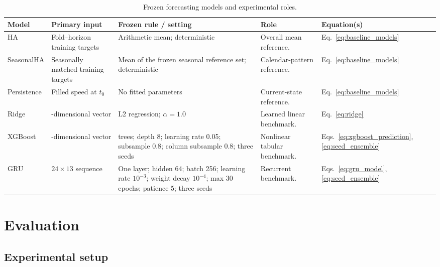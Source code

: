 \documentclass[pdflatex,sn-basic,Numbered]{sn-jnl}
\begin{document}
\begin{table}[!htbp]
\centering
\caption{Frozen forecasting models and experimental roles.}
\label{tab:model_protocol}
\footnotesize
\begin{tabularx}{\textwidth}{|>{\raggedright\arraybackslash}p{}|>{\raggedright\arraybackslash}p{}|>{\raggedright\arraybackslash}p{}|>{\raggedright\arraybackslash}X|>{\centering\arraybackslash}p{}|}
\hline
\textbf{Model} & \textbf{Primary input} & \textbf{Frozen rule / setting} & \textbf{Role} & \textbf{Equation(s)} \\
\hline
HA & Fold--horizon training targets & Arithmetic mean; deterministic & Overall mean reference. & Eq.~\eqref{eq:baseline_models} \\
\hline
SeasonalHA & Seasonally matched training targets & Mean of the frozen seasonal reference set; deterministic & Calendar-pattern reference. & Eq.~\eqref{eq:baseline_models} \\
\hline
Persistence & Filled speed at $t_0$ & No fitted parameters & Current-state reference. & Eq.~\eqref{eq:baseline_models} \\
\hline
Ridge & 315-dimensional vector & L2 regression; $\alpha=1.0$ & Learned linear benchmark. & Eq.~\eqref{eq:ridge} \\
\hline
XGBoost & 315-dimensional vector & 500 trees; depth 8; learning rate 0.05; subsample 0.8; column subsample 0.8; three seeds & Nonlinear tabular benchmark. & Eqs.~\eqref{eq:xgboost_prediction}, \eqref{eq:seed_ensemble} \\
\hline
GRU & $24\times13$ sequence & One layer; hidden 64; batch 256; learning rate $10^{-3}$; weight decay $10^{-4}$; max 30 epochs; patience 5; three seeds & Recurrent benchmark. & Eqs.~\eqref{eq:gru_model}, \eqref{eq:seed_ensemble} \\
\hline
\end{tabularx}
\end{table}


\section{Evaluation}
\label{sec:evaluation}

\subsection{Experimental setup}
\label{subsec:setup}
\end{document}
